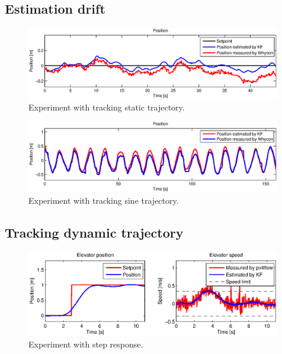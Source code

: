 \subsection{Estimation drift}

\begin{figure}[H]
\centering
\includegraphics[width=0.99\textwidth]{fig/experiment5_drift_constant.eps}
\caption{Experiment with tracking static trajectory.}
\label{fig:experiment_sine_1}
\end{figure}

\begin{figure}[H]
\centering
\includegraphics[width=0.99\textwidth]{fig/experiment5_drift_sine.eps}
\caption{Experiment with tracking sine trajectory.}
\label{fig:experiment_drift_sine}
\end{figure}

\subsection{Tracking dynamic trajectory}
\label{cap:dynamic_trajectory_tracking}

\begin{figure}[h]
\centering
\includegraphics[width=0.99\textwidth]{fig/experiment2_step.eps}
\caption{Experiment with step response.}
\label{fig:experiment_sine_1}
\end{figure}

